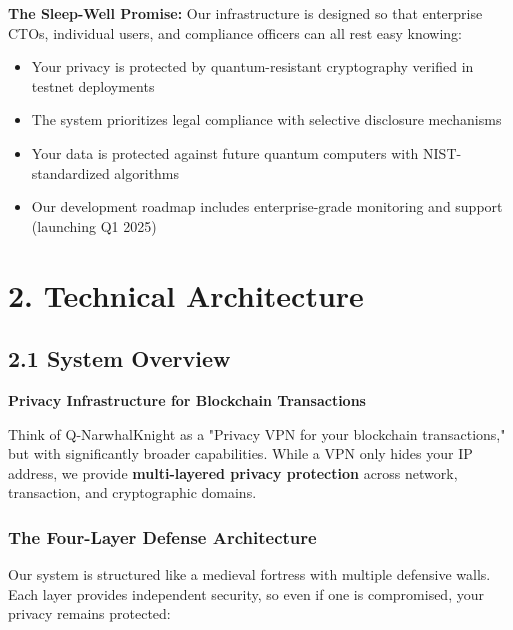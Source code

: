 \documentclass[11pt,a4paper]{article}
\begin{document}
\textbf{The Sleep-Well Promise:} Our infrastructure is designed so that enterprise CTOs, individual users, and compliance officers can all rest easy knowing:
\begin{itemize}
    \item Your privacy is protected by quantum-resistant cryptography verified in testnet deployments
    \item The system prioritizes legal compliance with selective disclosure mechanisms
    \item Your data is protected against future quantum computers with NIST-standardized algorithms
    \item Our development roadmap includes enterprise-grade monitoring and support (launching Q1 2025)
\end{itemize}

\section{2. Technical Architecture}

\subsection{2.1 System Overview}

\textbf{Privacy Infrastructure for Blockchain Transactions}

Think of Q-NarwhalKnight as a "Privacy VPN for your blockchain transactions," but with significantly broader capabilities. While a VPN only hides your IP address, we provide \textbf{multi-layered privacy protection} across network, transaction, and cryptographic domains.

\subsubsection{The Four-Layer Defense Architecture}

Our system is structured like a medieval fortress with multiple defensive walls. Each layer provides independent security, so even if one is compromised, your privacy remains protected:
\end{document}
